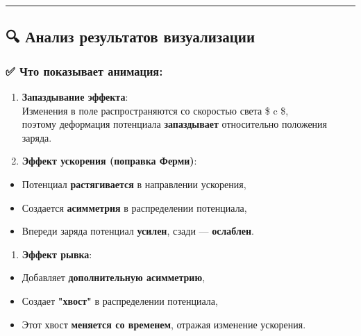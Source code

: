 \documentclass[11pt]{article}
\providecommand{\tightlist}{%
      \setlength{\itemsep}{0pt}\setlength{\parskip}{0pt}}
\begin{document}
\begin{center}\rule{0.5\linewidth}{\linethickness}\end{center}

\subsection{🔍 Анализ результатов
визуализации}\label{ux430ux43dux430ux43bux438ux437-ux440ux435ux437ux443ux43bux44cux442ux430ux442ux43eux432-ux432ux438ux437ux443ux430ux43bux438ux437ux430ux446ux438ux438}

\subsubsection{✅ Что показывает
анимация:}\label{ux447ux442ux43e-ux43fux43eux43aux430ux437ux44bux432ux430ux435ux442-ux430ux43dux438ux43cux430ux446ux438ux44f}

\begin{enumerate}
\def\labelenumi{\arabic{enumi}.}
\item
  \textbf{Запаздывание эффекта}:\\
  Изменения в поле распространяются со скоростью света \$ c \$,\\
  поэтому деформация потенциала \textbf{запаздывает} относительно
  положения заряда.
\item
  \textbf{Эффект ускорения (поправка Ферми)}:\\
\end{enumerate}

\begin{itemize}
\tightlist
\item
  Потенциал \textbf{растягивается} в направлении ускорения,\\
\item
  Создается \textbf{асимметрия} в распределении потенциала,\\
\item
  Впереди заряда потенциал \textbf{усилен}, сзади --- \textbf{ослаблен}.
\end{itemize}

\begin{enumerate}
\def\labelenumi{\arabic{enumi}.}
\setcounter{enumi}{2}
\tightlist
\item
  \textbf{Эффект рывка}:\\
\end{enumerate}

\begin{itemize}
\tightlist
\item
  Добавляет \textbf{дополнительную асимметрию},\\
\item
  Создает \textbf{"хвост"} в распределении потенциала,\\
\item
  Этот хвост \textbf{меняется со временем}, отражая изменение ускорения.
\end{itemize}
\end{document}
